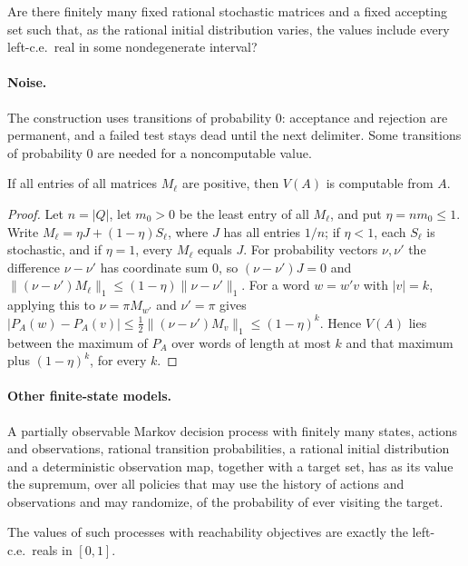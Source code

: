 \documentclass[11pt]{article}
\theoremstyle{plain}
\theoremstyle{definition}
\theoremstyle{remark}
\begin{document}
\begin{question}
Are there finitely many fixed rational stochastic matrices and a fixed accepting set such that, as the rational initial distribution varies, the values include every left-c.e.\ real in some nondegenerate interval?
\end{question}

\paragraph{Noise.} The construction uses transitions of probability $0$: acceptance and rejection are permanent, and a failed test stays dead until the next delimiter. Some transitions of probability $0$ are needed for a noncomputable value.

\begin{proposition}\label{prop:positive}
If all entries of all matrices $M_\ell$ are positive, then $V(A)$ is computable from $A$.
\end{proposition}

\begin{proof}
Let $n=|Q|$, let $m_0>0$ be the least entry of all $M_\ell$, and put $\eta=nm_0\le1$. Write $M_\ell=\eta J+(1-\eta)S_\ell$, where $J$ has all entries $1/n$; if $\eta<1$, each $S_\ell$ is stochastic, and if $\eta=1$, every $M_\ell$ equals $J$. For probability vectors $\nu,\nu'$ the difference $\nu-\nu'$ has coordinate sum $0$, so $(\nu-\nu')J=0$ and $\|(\nu-\nu')M_\ell\|_1\le(1-\eta)\|\nu-\nu'\|_1$. For a word $w=w'v$ with $|v|=k$, applying this to $\nu=\pi M_{w'}$ and $\nu'=\pi$ gives $|P_A(w)-P_A(v)|\le\frac12\|(\nu-\nu')M_v\|_1\le(1-\eta)^k$. Hence $V(A)$ lies between the maximum of $P_A$ over words of length at most $k$ and that maximum plus $(1-\eta)^k$, for every $k$.
\end{proof}

\paragraph{Other finite-state models.} A partially observable Markov decision process with finitely many states, actions and observations, rational transition probabilities, a rational initial distribution and a deterministic observation map, together with a target set, has as its value the supremum, over all policies that may use the history of actions and observations and may randomize, of the probability of ever visiting the target.

\begin{proposition}\label{prop:pomdp}
The values of such processes with reachability objectives are exactly the left-c.e.\ reals in $[0,1]$.
\end{proposition}
\end{document}
